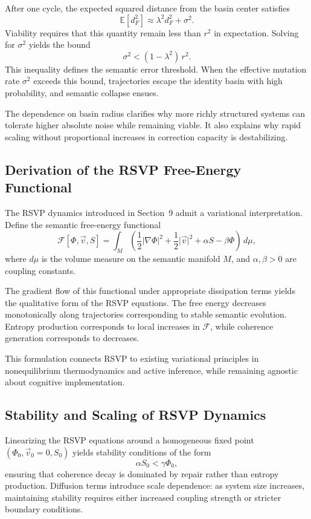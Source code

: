 \documentclass[11pt,oneside]{article}
\begin{document}
After one cycle, the expected squared distance from the basin center satisfies
\[
\mathbb{E}\!\left[d_F^2\right]
\approx
\lambda^2 d_F^2 + \sigma^2 .
\]
Viability requires that this quantity remain less than $r^2$ in expectation. Solving for $\sigma^2$ yields the bound
\[
\sigma^2 < (1 - \lambda^2)\, r^2 .
\]
This inequality defines the semantic error threshold. When the effective mutation rate $\sigma^2$ exceeds this bound, trajectories escape the identity basin with high probability, and semantic collapse ensues.

The dependence on basin radius clarifies why more richly structured systems can tolerate higher absolute noise while remaining viable. It also explains why rapid scaling without proportional increases in correction capacity is destabilizing.

\subsection{Derivation of the RSVP Free-Energy Functional}

The RSVP dynamics introduced in Section~9 admit a variational interpretation. Define the semantic free-energy functional
\[
\mathcal{F}[\Phi, \vec{v}, S]
=
\int_M
\left(
\frac{1}{2} \lvert \nabla \Phi \rvert^2
+
\frac{1}{2} \lvert \vec{v} \rvert^2
+
\alpha S
-
\beta \Phi
\right)
\, d\mu ,
\]
where $d\mu$ is the volume measure on the semantic manifold $M$, and $\alpha, \beta > 0$ are coupling constants.

The gradient flow of this functional under appropriate dissipation terms yields the qualitative form of the RSVP equations. The free energy decreases monotonically along trajectories corresponding to stable semantic evolution. Entropy production corresponds to local increases in $\mathcal{F}$, while coherence generation corresponds to decreases.

This formulation connects RSVP to existing variational principles in nonequilibrium thermodynamics and active inference, while remaining agnostic about cognitive implementation.

\subsection{Stability and Scaling of RSVP Dynamics}

Linearizing the RSVP equations around a homogeneous fixed point $(\Phi_0, \vec{v}_0 = 0, S_0)$ yields stability conditions of the form
\[
\alpha S_0 < \gamma \Phi_0 ,
\]
ensuring that coherence decay is dominated by repair rather than entropy production. Diffusion terms introduce scale dependence: as system size increases, maintaining stability requires either increased coupling strength or stricter boundary conditions.
\end{document}
